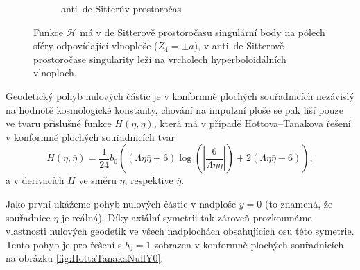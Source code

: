 \begin{figure}[ht]
\begin{subfigure}[b]{0.45\textwidth}
\begin{tikzpicture}
        \end{tikzpicture}
        \caption{anti--de Sitterův prostoročas}
    \end{subfigure}
    \caption{Funkce $\mathcal{H}$ má v de Sitterově prostoročasu singulární body na pólech sféry odpovídající vlnoploše ($Z_4 = \pm a$), v anti--de Sitterově
    prostoročase singularity leží na vrcholech hyperboloidálních vlnoploch.}
    \label{fig:funkceHhodnotyvADS}
\end{figure}

Geodetický pohyb nulových částic je v konformně plochých souřadnicích
nezávislý na hodnotě kosmologické konstanty, chování na impulzní ploše se pak liší pouze ve tvaru příslušné funkce $H(\eta, \bar{\eta})$, která má v případě Hottova--Tanakova řešení
v konformně plochých souřadnicích tvar
\begin{equation}
    \label{eq:Hotta_Tanaka_H_conf_flat_coords}
    H(\eta, \bar{\eta}) = \frac{1}{24} b_0 \left((\Lambda \eta \bar{\eta} + 6) \log \left(\left| \frac{6}{\Lambda \eta \bar{\eta} }\right| \right)+2 (\Lambda \eta \bar{\eta} - 6)\right),
\end{equation}
a v derivacích $H$ ve směru $\eta$, respektive $\bar{\eta}$.

Jako první ukážeme pohyb nulových částic v nadploše $y=0$ (to znamená, že souřadnice $\eta$ je reálná). Díky axiální symetrii tak zároveň prozkoumáme
vlastnosti nulových geodetik ve všech nadplochách obsahujících osu této symetrie.
Tento pohyb je pro řešení s $b_0 = 1$ zobrazen v konformně plochých souřadnicích  na obrázku \ref{fig:HottaTanakaNullY0}.


